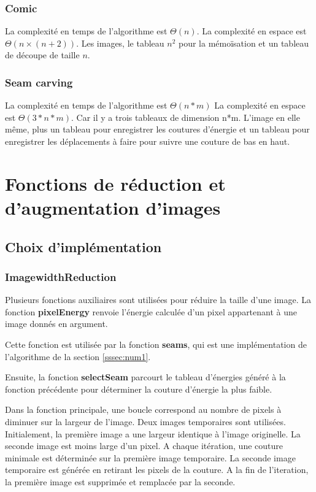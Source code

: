 \documentclass[10pt]{article}
\begin{document}
\subsubsection{Comic}
La complexité en temps de l'algorithme est $\Theta(n)$.
La complexité en espace est $\Theta(n \times (n+2))$. Les images, le tableau $n^2$ pour la mémoïsation et un tableau de découpe de taille $n$.
\subsubsection{Seam carving}
La complexité en temps de l'algorithme est $\Theta(n*m)$
La complexité en espace est $\Theta(3*n*m)$. Car il y a trois tableaux de dimension n*m. L'image en elle même, plus un tableau pour enregistrer les coutures d'énergie et un tableau pour enregistrer les déplacements à faire pour suivre une couture de bas en haut.

\section{Fonctions de réduction et d'augmentation d'images}
\subsection{Choix d'implémentation}
\subsubsection{ImagewidthReduction}
Plusieurs fonctions auxiliaires sont utilisées pour réduire la taille d'une image.
La fonction \textbf{pixelEnergy} renvoie l'énergie calculée d'un pixel appartenant à une image donnés en argument.

Cette fonction est utilisée par la fonction \textbf{seams}, qui est une implémentation de l'algorithme de la section \ref{sssec:num1}. 

Ensuite, la fonction \textbf{selectSeam} parcourt le tableau d'énergies généré à la fonction précédente pour déterminer la couture d'énergie la plus faible.

Dans la fonction principale, une boucle correspond au nombre de pixels à diminuer sur la largeur de l'image. Deux images temporaires sont utilisées. Initialement, la première image a une largeur identique à l'image originelle. La seconde image est moins large d'un pixel. A chaque itération, une couture minimale est déterminée sur la première image temporaire. La seconde image temporaire est générée en retirant les pixels de la couture. A la fin de l'iteration, la première image est supprimée et remplacée par la seconde.
\end{document}
